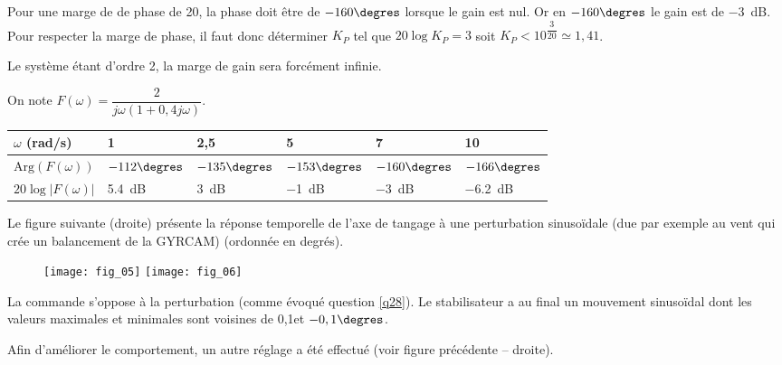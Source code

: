 



\ifprof
\begin{corrige}
Pour une marge  de de phase de 20\degres, la phase doit être de $-160\degres$ lorsque le gain est nul. Or en $-160\degres$ le gain est de \SI{-3}{dB}. Pour respecter la marge de phase, il faut donc déterminer $K_P$ tel que $20\log K_P = 3$ soit $K_P < 10^{\dfrac{3}{20}}\simeq1,41 $.

Le système étant d'ordre 2, la marge de gain sera forcément infinie.
\end{corrige}
\else


On note $F(\omega)= \dfrac{2}{j\omega \left(1+0,4 j\omega \right)}$.

\footnotesize
\begin{center}
\begin{tabular}{llllll}
\hline
$\omega$ (rad/s) & 1 & 2,5 & 5 & 7 & 10 \\ \hline
$\text{Arg}\left(F(\omega)\right)$  & $-112\degres$ & $-135\degres$ & $-153\degres$ & $-160\degres$ & $-166\degres$ \\ 
$20 \log \left| F(\omega)\right|$ & \SI{5,4}{dB} & \SI{3}{dB} & \SI{-1}{dB} & \SI{-3}{dB} & \SI{-6,2}{dB} \\ \hline
\end{tabular}
\end{center}
\normalsize

\fi

\ifprof
\else
Le figure suivante (droite) présente la réponse temporelle de l’axe de tangage à une perturbation sinusoïdale (due par
exemple au vent qui crée un balancement de la GYRCAM) (ordonnée en degrés).

\begin{figure*}
\texttt{[image: fig\_05]}\hfill
\texttt{[image: fig\_06]}
\end{figure*}

\fi

\ifprof
\begin{corrige}
La commande s'oppose à la perturbation (comme évoqué question \ref{q28}). Le stabilisateur a au final un mouvement sinusoïdal dont les valeurs maximales et minimales sont voisines de 0,1\degres et $-0,1\degres$. 
\end{corrige}
\else
\fi
\ifprof
\else
Afin d’améliorer le comportement, un autre réglage a été effectué (voir figure précédente -- droite).

